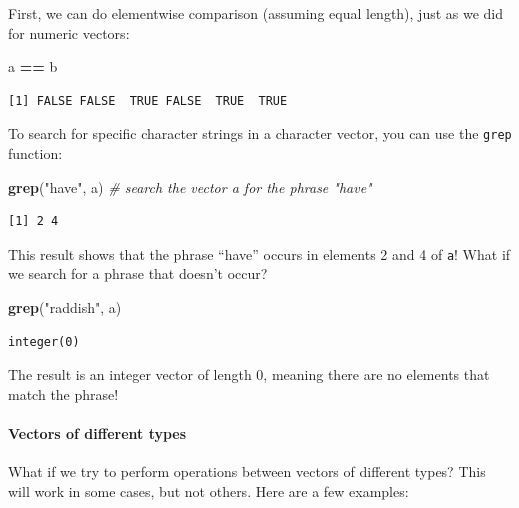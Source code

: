 \documentclass[
]{article}
\newenvironment{Shaded}{\begin{snugshade}}{\end{snugshade}}
\newcommand{\CommentTok}[1]{\textcolor[rgb]{0.56,0.35,0.01}{\textit{#1}}}
\newcommand{\KeywordTok}[1]{\textcolor[rgb]{0.13,0.29,0.53}{\textbf{#1}}}
\newcommand{\NormalTok}[1]{#1}
\newcommand{\OperatorTok}[1]{\textcolor[rgb]{0.81,0.36,0.00}{\textbf{#1}}}
\newcommand{\StringTok}[1]{\textcolor[rgb]{0.31,0.60,0.02}{#1}}
\begin{document}
First, we can do elementwise comparison (assuming equal length), just as we did for numeric vectors:

\begin{Shaded}
\begin{Highlighting}[]
\NormalTok{a }\OperatorTok{==}\StringTok{ }\NormalTok{b}
\end{Highlighting}
\end{Shaded}

\begin{verbatim}
[1] FALSE FALSE  TRUE FALSE  TRUE  TRUE
\end{verbatim}

To search for specific character strings in a character vector, you can use the \texttt{grep} function:

\begin{Shaded}
\begin{Highlighting}[]
\KeywordTok{grep}\NormalTok{(}\StringTok{"have"}\NormalTok{, a)   }\CommentTok{# search the vector a for the phrase "have"}
\end{Highlighting}
\end{Shaded}

\begin{verbatim}
[1] 2 4
\end{verbatim}

This result shows that the phrase ``have'' occurs in elements 2 and 4 of \texttt{a}!
What if we search for a phrase that doesn't occur?

\begin{Shaded}
\begin{Highlighting}[]
\KeywordTok{grep}\NormalTok{(}\StringTok{"raddish"}\NormalTok{, a)}
\end{Highlighting}
\end{Shaded}

\begin{verbatim}
integer(0)
\end{verbatim}

The result is an integer vector of length 0, meaning there are no elements that match the phrase!

\hypertarget{vectors-of-different-types}{%
\paragraph{Vectors of different types}\label{vectors-of-different-types}}

What if we try to perform operations between vectors of different types?
This will work in some cases, but not others. Here are a few examples:
\end{document}
